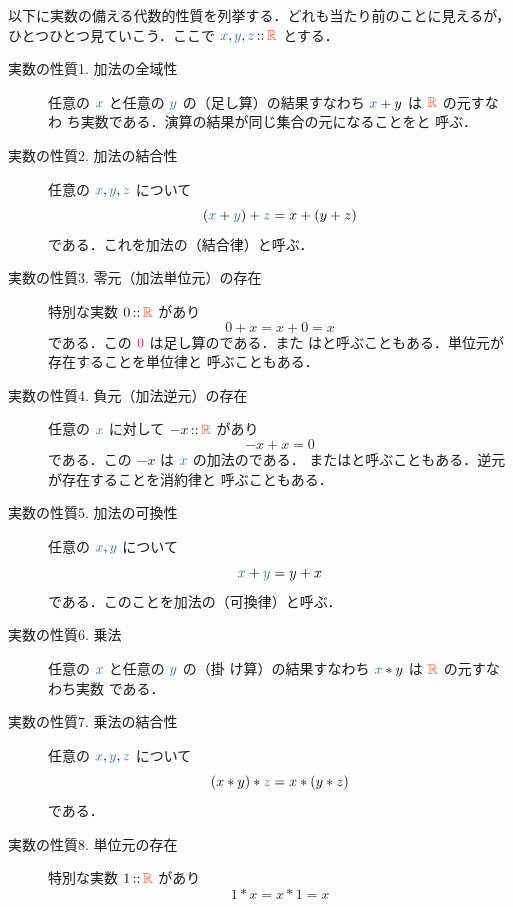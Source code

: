 \documentclass[a5paper,twoside,fleqn,draft]{jsbook}
\begin{document}
以下に実数の備える代数的性質を列挙する．どれも当たり前のことに見えるが，
ひとつひとつ見ていこう．ここで $\hVar{x},\hVar{y},\hVar{z}\mIn\mRSet$ とする．
\begin{description}
\item[実数の性質1. 加法の全域性] 任意の $\hVar{x}$ と任意の $\hVar{y}$ の（足し算）の結果すなわち $\hVar{x}+y$ は $\mRSet$ の元すなわ
ち実数である．演算の結果が同じ集合の元になることをと
呼ぶ．
\item[実数の性質2. 加法の結合性] 任意の $\hVar{x},\hVar{y},\hVar{z}$ について
\begin{equation}
(\hVar{x}+\hVar{y})+\hVar{z}=x+(y+z)
\end{equation}
である．これを加法の（結合律）と呼ぶ．
\item[実数の性質3. 零元（加法単位元）の存在] 特別な実数 $0\mIn\mRSet$ があり
\begin{equation}
0+x=x+0=x
\end{equation}
である．この $\hConstant{0}$ は足し算のである．また
はと呼ぶこともある．単位元が存在することを単位律と
呼ぶこともある．
\item[実数の性質4. 負元（加法逆元）の存在] 任意の $\hVar{x}$ に対して
$-x\mIn\mRSet$ があり
\begin{equation}
-x+x=0
\end{equation}
である．この $-x$ は $\hVar{x}$ の加法のである．
またはと呼ぶこともある．逆元が存在することを消約律と
呼ぶこともある．
\item[実数の性質5. 加法の可換性] 任意の $\hVar{x},\hVar{y}$ について
\begin{equation}
\hVar{x}+\hVar{y}=y+x
\end{equation}
である．このことを加法の（可換律）と呼ぶ．
\item[実数の性質6. 乗法] 任意の $\hVar{x}$ と任意の $\hVar{y}$ の（掛
け算）の結果すなわち $\hVar{x}*y$ は $\mRSet$ の元すなわち実数
である．
\item[実数の性質7. 乗法の結合性] 任意の $\hVar{x},\hVar{y},\hVar{z}$ について
\begin{equation}
(x*y)*\hVar{z}=x*(y*z)
\end{equation}
である．
\item[実数の性質8. 単位元の存在] 特別な実数 $1\mIn\mRSet$ があり
\begin{equation}
1*x=x*1=x
\end{equation}

\end{description}
\end{document}
